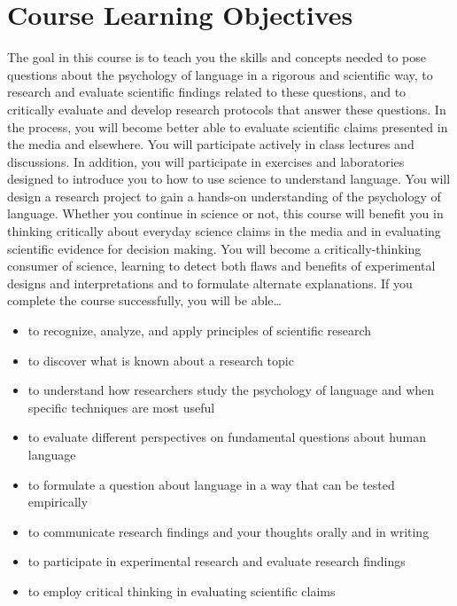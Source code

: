 \documentclass[
  letterpaper,
  DIV=11,
  numbers=noendperiod]{scrreprt}
\providecommand{\tightlist}{%
  \setlength{\itemsep}{0pt}\setlength{\parskip}{0pt}}\usepackage{longtable,booktabs,array}
\begin{document}
\hypertarget{course-learning-objectives}{%
\section*{Course Learning Objectives}\label{course-learning-objectives}}


The goal in this course is to teach you the skills and concepts needed
to pose questions about the psychology of language in a rigorous and
scientific way, to research and evaluate scientific findings related to
these questions, and to critically evaluate and develop research
protocols that answer these questions. In the process, you will become
better able to evaluate scientific claims presented in the media and
elsewhere. You will participate actively in class lectures and
discussions. In addition, you will participate in exercises and
laboratories designed to introduce you to how to use science to
understand language. You will design a research project to gain a
hands-on understanding of the psychology of language. Whether you
continue in science or not, this course will benefit you in thinking
critically about everyday science claims in the media and in evaluating
scientific evidence for decision making. You will become a
critically-thinking consumer of science, learning to detect both flaws
and benefits of experimental designs and interpretations and to
formulate alternate explanations. If you complete the course
successfully, you will be able\ldots{}

\begin{itemize}
\tightlist
\item
  to recognize, analyze, and apply principles of scientific research
\item
  to discover what is known about a research topic
\item
  to understand how researchers study the psychology of language and
  when specific techniques are most useful
\item
  to evaluate different perspectives on fundamental questions about
  human language
\item
  to formulate a question about language in a way that can be tested
  empirically
\item
  to communicate research findings and your thoughts orally and in
  writing
\item
  to participate in experimental research and evaluate research findings
\item
  to employ critical thinking in evaluating scientific claims
\end{itemize}
\end{document}
